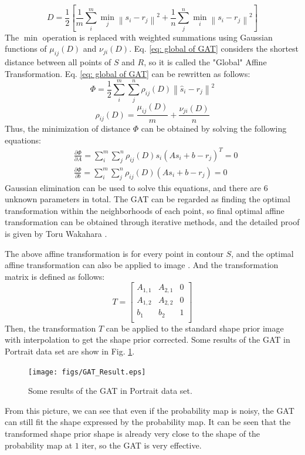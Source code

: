 \begin{equation}\label{eq: global of GAT}
    D = \frac{1}{2}\left[ \frac{1}{m}\sum_i^m\underset{j}{\min}\left\| s_i-r_j \right\|^2 + \frac{1}{n}\sum_j^n\underset{i}{\min}\left\| s_i-r_j \right\|^2 \right]
\end{equation}
The $\min$ operation is replaced with weighted summations using Gaussian functions of $\mu_{ij}(D)$ and $\nu_{ji}(D)$. Eq. \ref{eq: global of GAT} considers the shortest distance between all points of $S$ and $R$, so it is called the "Global" Affine Transformation. Eq. \ref{eq: global of GAT} can be rewritten as follows:
\begin{equation}
    \Phi = \frac{1}{2} \sum_i^m\sum_j^n \rho_{ij}(D)\left\| \hat{s}_i - r_j \right\|^2
\end{equation}
\begin{equation*}
    \rho_{ij}(D) = \frac{\mu_{ij}(D)}{m} + \frac{\nu_{ji}(D)}{n}
\end{equation*}
Thus, the minimization of distance $\Phi$ can be obtained by solving the following equations:
\begin{align}\label{eq: equations of GAT}
    &\frac{\partial \Phi}{\partial A}  = \sum_i^m\sum_j^n\rho_{ij}(D)s_i(As_i+b-r_j)^T = 0 \\
    &\frac{\partial \Phi}{\partial b}  = \sum_i^m\sum_j^n\rho_{ij}(D)(As_i+b-r_j) = 0
\end{align}
Gaussian elimination can be used to solve this equations, and there are $6$ unknown parameters in total. The GAT can be regarded as finding the optimal transformation within the neighborhoods of each point, so final optimal affine transformation can be obtained through iterative methods, and the detailed proof is given by Toru Wakahara \cite{GAT:wakahara1998adaptive}.

The above affine transformation is for every point in contour $S$, and the optimal affine transformation can also be applied to image \cite{GAT:CV:hartley2003multiple}. And the transformation matrix is defined as follows:
\begin{equation}
    T = \begin{bmatrix}
          A_{1,1} & A_{2,1} & 0 \\
          A_{1,2} & A_{2,2} & 0 \\
          b_1 & b_2 & 1 \\
        \end{bmatrix}
\end{equation}
Then, the transformation $T$ can be applied to the standard shape prior image with interpolation to get the shape prior corrected. Some results of the GAT in Portrait data set are show in Fig. \ref{fig: Some results of the GAT}.
\begin{figure}[h]
    \centering
    \texttt{[image: figs/GAT\_Result.eps]}
    \caption{Some results of the GAT in Portrait data set.}
    \label{fig: Some results of the GAT}
\end{figure}
From this picture, we can see that even if the probability map is noisy, the GAT can still fit the shape expressed by the probability map. It can be seen that the transformed shape prior shape is already very close to the shape of the probability map at $1$ iter, so the GAT is very effective.

